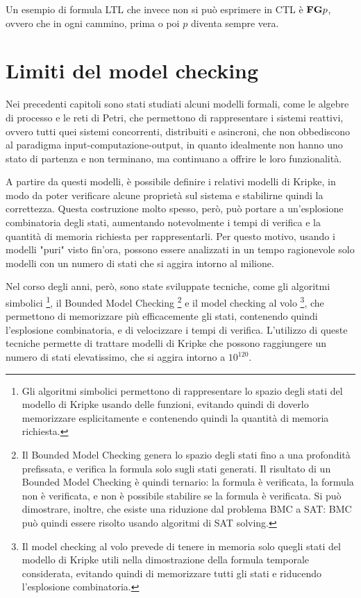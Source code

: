 Un esempio di formula LTL che invece non si può esprimere in CTL è
$\textnormal{\textbf{F}} \textnormal{\textbf{G}} p$, ovvero che in ogni cammino, prima o poi
$p$ diventa sempre vera.

\section{Limiti del model checking}
Nei precedenti capitoli sono stati studiati alcuni modelli formali,
come le algebre di processo e le reti di Petri, che permettono di
rappresentare i sistemi reattivi, ovvero tutti quei sistemi
concorrenti, distribuiti e asincroni, che non obbediscono al paradigma
input-computazione-output, in quanto idealmente non hanno uno stato
di partenza e non terminano, ma continuano a offrire le loro funzionalità.

A partire da questi modelli, è possibile definire i relativi modelli di Kripke,
in modo da poter verificare alcune proprietà sul sistema e stabilirne
quindi la correttezza. Questa costruzione molto spesso, però, può portare
a un'esplosione combinatoria degli stati, aumentando notevolmente
i tempi di verifica e la quantità di memoria richiesta per rappresentarli.
Per questo motivo, usando i modelli "puri" visto fin'ora, possono essere
analizzati in un tempo ragionevole solo modelli con un numero di stati
che si aggira intorno al milione.

Nel corso degli anni, però, sono state sviluppate tecniche, come
gli algoritmi simbolici
\footnote{Gli algoritmi simbolici permettono di rappresentare lo spazio
degli stati del modello di Kripke usando delle funzioni, evitando quindi
di doverlo memorizzare esplicitamente e contenendo quindi la quantità
di memoria richiesta.},
il Bounded Model Checking
\footnote{Il Bounded Model Checking genera lo spazio degli stati fino a
una profondità prefissata, e verifica la formula solo sugli stati generati.
Il risultato di un Bounded Model Checking è quindi ternario: la formula
è verificata, la formula non è verificata, e non è possibile stabilire
se la formula è verificata.
Si può dimostrare, inoltre, che esiste una riduzione dal problema BMC a SAT:
BMC può quindi essere risolto usando algoritmi di SAT solving.}
e il model checking al volo
\footnote{Il model checking al volo prevede di tenere in memoria solo quegli
stati del modello di Kripke utili nella dimostrazione della formula temporale
considerata, evitando quindi di memorizzare tutti gli stati e riducendo
l'esplosione combinatoria.},
che permettono di memorizzare più efficacemente gli stati,
contenendo quindi l'esplosione combinatoria, e di velocizzare i tempi di verifica.
L'utilizzo di queste tecniche permette di trattare modelli di Kripke che possono
raggiungere un numero di stati elevatissimo, che si aggira intorno a $10^{120}$.

